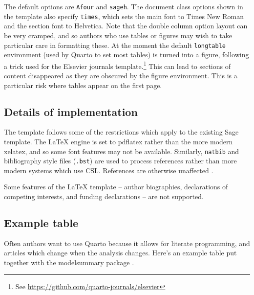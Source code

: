 \documentclass[
  Afour,
  times,
  sageh]{sagej}
\begin{document}
The default options are \texttt{Afour} and \texttt{sageh}. The document
class options shown in the template also specify \texttt{times}, which
sets the main font to Times New Roman and the section font to Helvetica.
Note that the double column option layout can be very cramped, and so
authors who use tables or figures may wish to take particular care in
formatting these. At the moment the default \texttt{longtable}
environment (used by Quarto to set most tables) is turned into a figure,
following a trick used for the Elsevier journals template.\footnote{See
  \url{https://github.com/quarto-journals/elsevier}} This can lead to
sections of content disappeared as they are obscured by the figure
environment. This is a particular risk where tables appear on the first
page.

\hypertarget{details-of-implementation}{%
\subsection{Details of implementation}\label{details-of-implementation}}

The template follows some of the restrictions which apply to the
existing Sage template. The \LaTeX{} engine is set to pdflatex rather
than the more modern xelatex, and so some font features may not be
available. Similarly, \texttt{natbib} and bibliography style files
(\texttt{.bst}) are used to process references rather than more modern
systems which use CSL. References are otherwise unaffected
\citep{CameronTrivedi2013, hanretty2022party}.

Some features of the \LaTeX{} template -- author biographies,
declarations of competing interests, and funding declarations -- are not
supported.

\hypertarget{example-table}{%
\subsection{Example table}\label{example-table}}

Often authors want to use Quarto because it allows for literate
programming, and articles which change when the analysis changes. Here's
an example table put together with the modelsummary package
\citep{msummary}.
\end{document}
